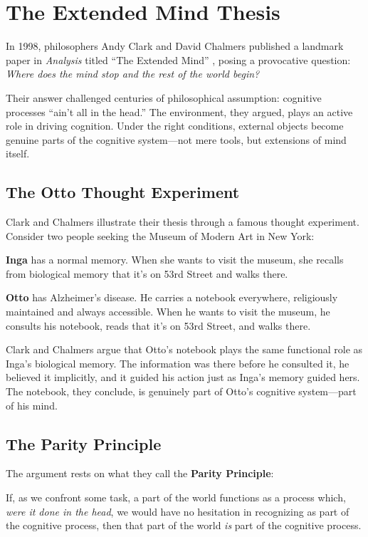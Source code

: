 \chapter{The Extended Mind Thesis}

In 1998, philosophers Andy Clark and David Chalmers published a landmark paper in \emph{Analysis} titled ``The Extended Mind'' \cite{clark1998extended}, posing a provocative question: \emph{Where does the mind stop and the rest of the world begin?}

Their answer challenged centuries of philosophical assumption: cognitive processes ``ain't all in the head.'' The environment, they argued, plays an active role in driving cognition. Under the right conditions, external objects become genuine parts of the cognitive system---not mere tools, but extensions of mind itself.

\section{The Otto Thought Experiment}

Clark and Chalmers illustrate their thesis through a famous thought experiment. Consider two people seeking the Museum of Modern Art in New York:

\textbf{Inga} has a normal memory. When she wants to visit the museum, she recalls from biological memory that it's on 53rd Street and walks there.

\textbf{Otto} has Alzheimer's disease. He carries a notebook everywhere, religiously maintained and always accessible. When he wants to visit the museum, he consults his notebook, reads that it's on 53rd Street, and walks there.

Clark and Chalmers argue that Otto's notebook plays the same functional role as Inga's biological memory. The information was there before he consulted it, he believed it implicitly, and it guided his action just as Inga's memory guided hers. The notebook, they conclude, is genuinely part of Otto's cognitive system---part of his mind.

\section{The Parity Principle}

The argument rests on what they call the \textbf{Parity Principle}:

\begin{quotebox}
If, as we confront some task, a part of the world functions as a process which, \emph{were it done in the head}, we would have no hesitation in recognizing as part of the cognitive process, then that part of the world \emph{is} part of the cognitive process.
\end{quotebox}

